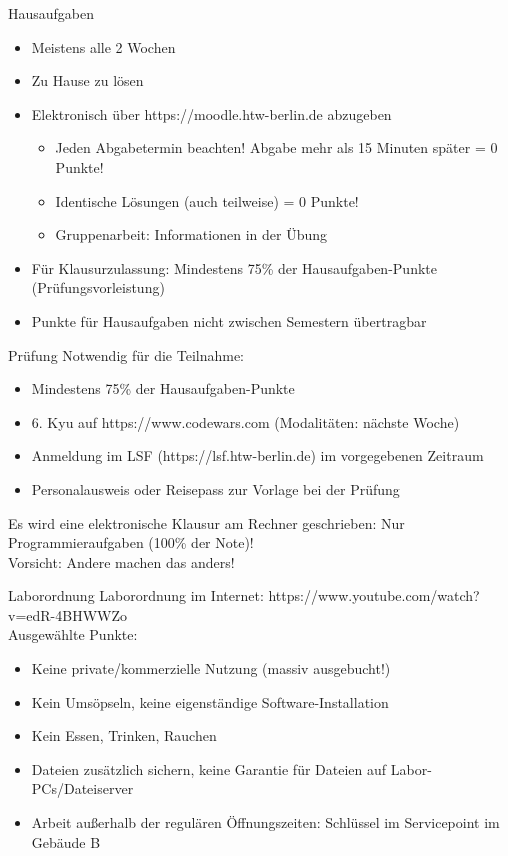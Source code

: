 \documentclass[aspectratio=169,t]{beamer}
\begin{document}
\begin{frame}{Hausaufgaben}
	\begin{itemize}
		\item Meistens alle 2 Wochen
		\item Zu Hause zu lösen
		\item Elektronisch über https://moodle.htw-berlin.de abzugeben
		\begin{itemize}
			\item Jeden Abgabetermin beachten! Abgabe mehr als 15 Minuten später = 0 Punkte!
			\item Identische Lösungen (auch teilweise) = 0 Punkte!
			\item Gruppenarbeit: Informationen in der Übung
		\end{itemize}
		\item Für Klausurzulassung: Mindestens 75\% der Hausaufgaben-Punkte (Prüfungsvorleistung)
		\item Punkte für Hausaufgaben nicht zwischen Semestern übertragbar
	\end{itemize}
\end{frame}

\begin{frame}{Prüfung}
	Notwendig für die Teilnahme:
	\begin{itemize}
		\item Mindestens 75\% der Hausaufgaben-Punkte
		\item 6. Kyu auf https://www.codewars.com (Modalitäten: nächste Woche)
		\item Anmeldung im LSF (https://lsf.htw-berlin.de) im vorgegebenen Zeitraum
		\item Personalausweis oder Reisepass zur Vorlage bei der Prüfung
	\end{itemize}
	Es wird eine elektronische Klausur am Rechner geschrieben: Nur Programmieraufgaben (100\% der Note)!\\
	Vorsicht: Andere machen das anders!
\end{frame}

\begin{frame}{Laborordnung}
	Laborordnung im Internet: https://www.youtube.com/watch?v=edR-4BHWWZo\\
	Ausgewählte Punkte:
	\begin{itemize}
		\item Keine private/kommerzielle Nutzung (massiv ausgebucht!)
		\item Kein Umsöpseln, keine eigenständige Software-Installation
		\item Kein Essen, Trinken, Rauchen
		\item Dateien zusätzlich sichern, keine Garantie für Dateien auf Labor-PCs/Dateiserver
		\item Arbeit außerhalb der regulären Öffnungszeiten: Schlüssel im Servicepoint im Gebäude B
	\end{itemize}
\end{frame}
\end{document}
